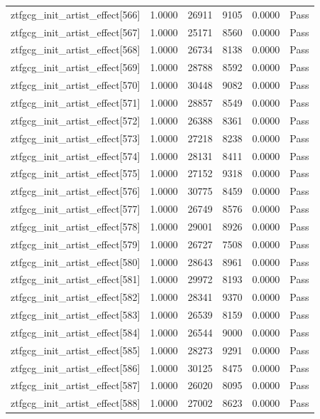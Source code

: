 \begin{table}[htbp]
\begin{tabular}{llrrll}
ztfgcg\_init\_artist\_effect[566] & 1.0000 & 26911 & 9105 & 0.0000 & Pass \\
ztfgcg\_init\_artist\_effect[567] & 1.0000 & 25171 & 8560 & 0.0000 & Pass \\
ztfgcg\_init\_artist\_effect[568] & 1.0000 & 26734 & 8138 & 0.0000 & Pass \\
ztfgcg\_init\_artist\_effect[569] & 1.0000 & 28788 & 8592 & 0.0000 & Pass \\
ztfgcg\_init\_artist\_effect[570] & 1.0000 & 30448 & 9082 & 0.0000 & Pass \\
ztfgcg\_init\_artist\_effect[571] & 1.0000 & 28857 & 8549 & 0.0000 & Pass \\
ztfgcg\_init\_artist\_effect[572] & 1.0000 & 26388 & 8361 & 0.0000 & Pass \\
ztfgcg\_init\_artist\_effect[573] & 1.0000 & 27218 & 8238 & 0.0000 & Pass \\
ztfgcg\_init\_artist\_effect[574] & 1.0000 & 28131 & 8411 & 0.0000 & Pass \\
ztfgcg\_init\_artist\_effect[575] & 1.0000 & 27152 & 9318 & 0.0000 & Pass \\
ztfgcg\_init\_artist\_effect[576] & 1.0000 & 30775 & 8459 & 0.0000 & Pass \\
ztfgcg\_init\_artist\_effect[577] & 1.0000 & 26749 & 8576 & 0.0000 & Pass \\
ztfgcg\_init\_artist\_effect[578] & 1.0000 & 29001 & 8926 & 0.0000 & Pass \\
ztfgcg\_init\_artist\_effect[579] & 1.0000 & 26727 & 7508 & 0.0000 & Pass \\
ztfgcg\_init\_artist\_effect[580] & 1.0000 & 28643 & 8961 & 0.0000 & Pass \\
ztfgcg\_init\_artist\_effect[581] & 1.0000 & 29972 & 8193 & 0.0000 & Pass \\
ztfgcg\_init\_artist\_effect[582] & 1.0000 & 28341 & 9370 & 0.0000 & Pass \\
ztfgcg\_init\_artist\_effect[583] & 1.0000 & 26539 & 8159 & 0.0000 & Pass \\
ztfgcg\_init\_artist\_effect[584] & 1.0000 & 26544 & 9000 & 0.0000 & Pass \\
ztfgcg\_init\_artist\_effect[585] & 1.0000 & 28273 & 9291 & 0.0000 & Pass \\
ztfgcg\_init\_artist\_effect[586] & 1.0000 & 30125 & 8475 & 0.0000 & Pass \\
ztfgcg\_init\_artist\_effect[587] & 1.0000 & 26020 & 8095 & 0.0000 & Pass \\
ztfgcg\_init\_artist\_effect[588] & 1.0000 & 27002 & 8623 & 0.0000 & Pass \\

\end{tabular}
\end{table}
